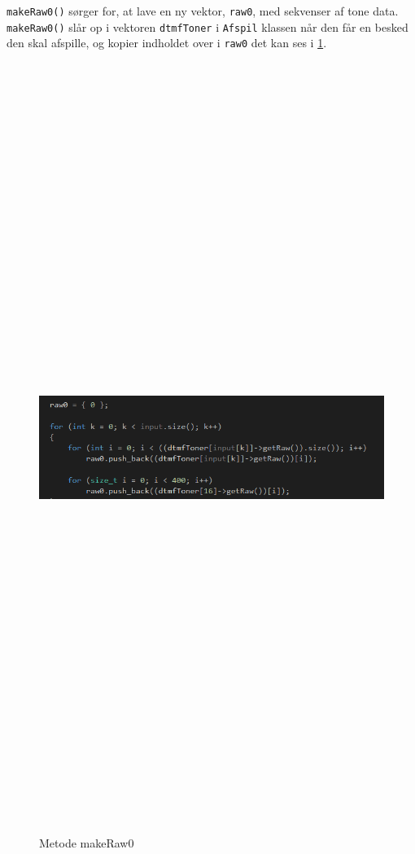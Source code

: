 \texttt{makeRaw0()} sørger for, at lave en ny vektor, \texttt{\textcolor{dkgreen}{raw0}}, med sekvenser af tone data. \texttt{makeRaw0()} slår op i vektoren \texttt{\textcolor{dkgreen}{dtmfToner}} i \texttt{Afspil} klassen når den får en besked den skal afspille, og kopier indholdet over i \texttt{\textcolor{dkgreen}{raw0}} det kan ses i \ref{fig:makeRaw0}.
\begin{figure}[ht]
	\centering
	\includegraphics[width=15cm,height=25cm,keepaspectratio]{pictures/makeRaw0.PNG}
	\caption{Metode makeRaw0}
	\label{fig:makeRaw0}
\end{figure}
